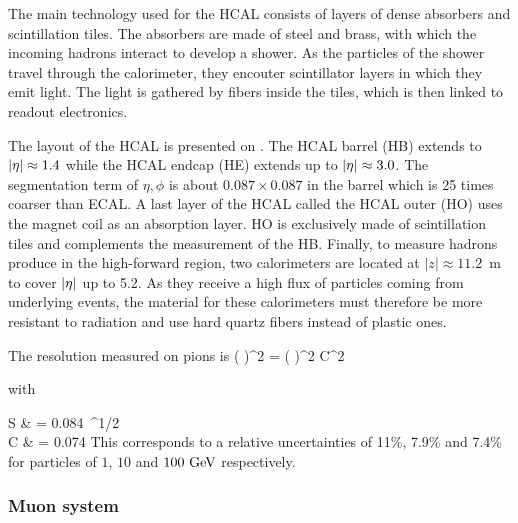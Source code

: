         The main technology used for the HCAL consists of layers of dense absorbers and
        scintillation tiles. The absorbers are made of steel and brass, with which
        the incoming hadrons interact to develop a shower. As the particles of the shower
        travel through the calorimeter, they encouter scintillator layers in which they
        emit light. The light is gathered by fibers inside the tiles, which is then
        linked to readout electronics.


        The layout of the HCAL is presented on . The HCAL barrel
        (HB) extends to $\left| \eta \right| \approx 1.4$ while the HCAL endcap (HE) extends up to
        $\left| \eta \right| \approx 3.0$. The segmentation term of $\eta,\phi$ is about $0.087 \times 0.087$
        in the barrel which is 25 times coarser than ECAL. A last layer of the HCAL called
        the HCAL outer (HO) uses the magnet coil as an absorption layer. HO is exclusively
        made of scintillation tiles and complements the measurement of the HB. Finally, to
        measure hadrons produce in the high-forward region, two calorimeters are located at
        $\left|z\right| \approx 11.2$~m to cover $\left| \eta \right|$ up to 5.2. As they receive a high flux of
        particles coming from underlying events, the material for these calorimeters must
        therefore be more resistant to radiation and use hard quartz fibers instead of
        plastic ones.

        The resolution measured on pions is
        {
            \left(  \right)^2
            =
            \left(  \right)^2
            \oplus
            C^2
        }

        with

        {
            S & = 0.084~^{1/2} \\
            C & = 0.074\nonumber
        }
        This corresponds to a relative uncertainties of 11\%, 7.9\% and 7.4\% for particles
        of $1$, $10$ and $100~\text{GeV}$ respectively.

            \subsubsection{Muon system}

